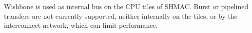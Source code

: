 Wishbone is used as internal bus on the CPU tiles of SHMAC. Burst or pipelined transfers are
not currently supported, neither internally on the tiles, or by the interconnect network, which can limit performance.

%
